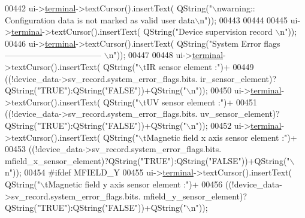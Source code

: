 \begin{DoxyCode}
00442        ui->\hyperlink{a00027_aae71c46ea4546df5994735dee573b2dd}{terminal}->textCursor().insertText( QString(\textcolor{stringliteral}{"\(\backslash\)nwarning:: Configuration data is not marked
       as valid user data\(\backslash\)n"}));
00443 
00444 
00445        ui->\hyperlink{a00027_aae71c46ea4546df5994735dee573b2dd}{terminal}->textCursor().insertText( QString(\textcolor{stringliteral}{"Device supervision record \(\backslash\)n"}));
00446        ui->\hyperlink{a00027_aae71c46ea4546df5994735dee573b2dd}{terminal}->textCursor().insertText( QString(\textcolor{stringliteral}{"System Error flags 
       ----------------------------------- \(\backslash\)n"}));
00447 
00448        ui->\hyperlink{a00027_aae71c46ea4546df5994735dee573b2dd}{terminal}->textCursor().insertText( QString(\textcolor{stringliteral}{"\(\backslash\)tIR sensor element :"})+
00449                                             ((!device\_data->sv\_record.system\_error\_flags.bits.
      ir\_sensor\_element)?QString(\textcolor{stringliteral}{"TRUE"}):QString(\textcolor{stringliteral}{"FALSE"}))+QString(\textcolor{stringliteral}{"\(\backslash\)n"}));
00450        ui->\hyperlink{a00027_aae71c46ea4546df5994735dee573b2dd}{terminal}->textCursor().insertText( QString(\textcolor{stringliteral}{"\(\backslash\)tUV sensor element :"})+
00451                                             ((!device\_data->sv\_record.system\_error\_flags.bits.
      uv\_sensor\_element)?QString(\textcolor{stringliteral}{"TRUE"}):QString(\textcolor{stringliteral}{"FALSE"}))+QString(\textcolor{stringliteral}{"\(\backslash\)n"}));
00452        ui->\hyperlink{a00027_aae71c46ea4546df5994735dee573b2dd}{terminal}->textCursor().insertText( QString(\textcolor{stringliteral}{"\(\backslash\)tMagnetic field x axis sensor element :"})+
00453                                             ((!device\_data->sv\_record.system\_error\_flags.bits.
      mfield\_x\_sensor\_element)?QString(\textcolor{stringliteral}{"TRUE"}):QString(\textcolor{stringliteral}{"FALSE"}))+QString(\textcolor{stringliteral}{"\(\backslash\)n"}));
00454 \textcolor{preprocessor}{#ifdef MFIELD\_Y}
00455        ui->\hyperlink{a00027_aae71c46ea4546df5994735dee573b2dd}{terminal}->textCursor().insertText( QString(\textcolor{stringliteral}{"\(\backslash\)tMagnetic field y axis sensor element :"})+
00456                                             ((!device\_data->sv\_record.system\_error\_flags.bits.
      mfield\_y\_sensor\_element)?QString(\textcolor{stringliteral}{"TRUE"}):QString(\textcolor{stringliteral}{"FALSE"}))+QString(\textcolor{stringliteral}{"\(\backslash\)n"}));

\end{DoxyCode}
